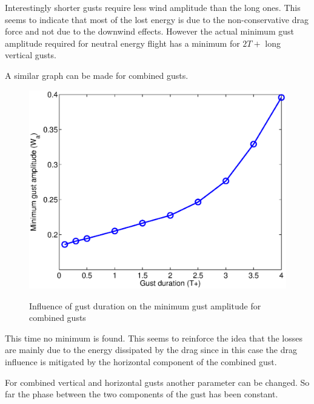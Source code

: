 \FloatBarrier

\par Interestingly shorter gusts require less wind amplitude than the long ones.
This seems to indicate that most of the lost energy is due to the non-conservative drag force and not due to the downwind effects.
However the actual minimum gust amplitude required for neutral energy flight has a minimum for $2T+$ long vertical gusts.

\par A similar graph can be made for combined gusts.

\begin{figure}[h!]
  \begin{center}
    \scalebox{0.8}
    {\includegraphics{./Figures/combined_gust_amplitude_vs_duration.eps}}
  \end{center}
  \caption{Influence of gust duration on the minimum gust amplitude for combined gusts}
  \label{fig:combined_amplitude_duration}
\end{figure}


\FloatBarrier

\par This time no minimum is found.
This seems to reinforce the idea that the losses are mainly due to the energy dissipated by the drag since in this case the drag influence is mitigated by the horizontal component of the combined gust.


For combined vertical and horizontal gusts another parameter can be changed.
So far the phase between the two components of the gust has been constant.


